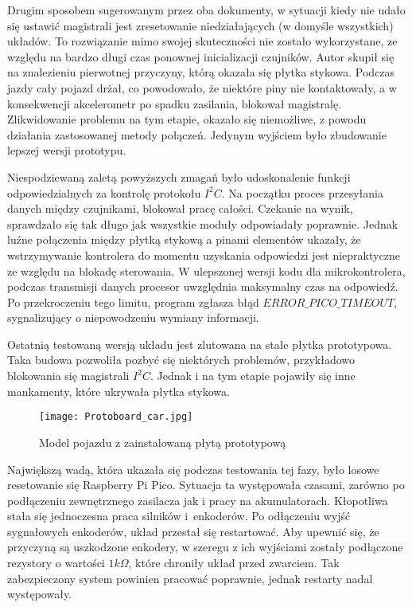         Drugim sposobem sugerowanym przez oba dokumenty,
        w sytuacji kiedy nie udało się ustawić magistrali jest zresetowanie niedziałających (w domyśle wszystkich) układów.
        To rozwiązanie mimo swojej skuteczności nie zostało wykorzystane,
        ze względu na bardzo długi czas ponownej inicializacji czujników.
        Autor skupił się na znalezieniu pierwotnej przyczyny, którą okazała się płytka stykowa.
        Podczas jazdy cały pojazd drżał, co powodowało, że niektóre piny nie kontaktowały,
        a w konsekwencji akcelerometr po spadku zasilania, blokował magistralę.
        Zlikwidowanie problemu na tym etapie, okazało się niemożliwe, z powodu działania zastosowanej metody połączeń.
        Jedynym wyjściem było zbudowanie lepszej wersji prototypu.

        Niespodziewaną zaletą powyższych zmagań było udoskonalenie funkcji odpowiedzialnych za kontrolę protokołu $I^2C$.
        Na początku proces przesyłania danych między czujnikami, blokował pracę całości.
        Czekanie na wynik, sprawdzało się tak długo jak wszystkie moduły odpowiadały poprawnie.
        Jednak luźne połączenia między płytką stykową a pinami elementów ukazały,
        że wstrzymywanie kontrolera do momentu uzyskania odpowiedzi jest niepraktyczne ze względu na blokadę sterowania.
        W ulepszonej wersji kodu dla mikrokontrolera, podczas transmisji danych procesor uwzględnia maksymalny czas na odpowiedź.
        Po przekroczeniu tego limitu, program zgłasza błąd $ERROR\_PICO\_TIMEOUT$, sygnalizujący o niepowodzeniu wymiany informacji.

        Ostatnią testowaną wersją układu jest zlutowana na stałe płytka prototypowa.
        Taka budowa pozwoliła pozbyć się niektórych problemów, przykładowo blokowania się magistrali $I^2C$.
        Jednak i na tym etapie pojawiły się inne mankamenty, które ukrywała płytka stykowa.
        \begin{figure}[!ht]
            \centering
            \texttt{[image: Protoboard\_car.jpg]}
            \caption{Model pojazdu z zainstalowaną płytą prototypową}
            \label{fig:protoboard_car}
        \end{figure}

        Największą wadą, która ukazała się podczas testowania tej fazy, było losowe resetowanie się Raspberry Pi Pico.
        Sytuacja ta występowała czasami, zarówno po podłączeniu zewnętrznego zasilacza jak i pracy na akumulatorach.
        Kłopotliwa stała się jednoczesna praca silników i~enkoderów.
        Po odłączeniu wyjść sygnałowych enkoderów, układ przestał się restartować.
        Aby upewnić się, że przyczyną są uszkodzone enkodery, w szeregu z ich wyjściami zostały podłączone rezystory o wartości $1k\Omega$, które chroniły układ przed zwarciem.
        Tak zabezpieczony system powinien pracować poprawnie, jednak restarty nadal występowały.

